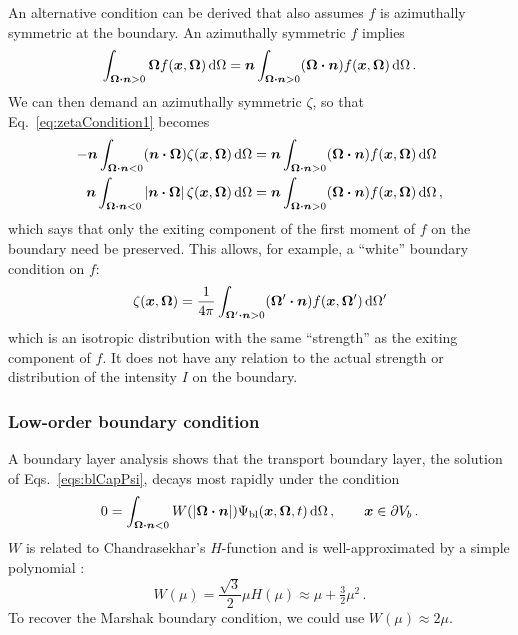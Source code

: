 An alternative condition can be derived that also assumes $f$ is azimuthally
symmetric at the boundary. An azimuthally symmetric $f$ implies
\begin{equation*}
  \int_{\bm{\Omega} \bm{\cdot} \bm{n} > 0}
  \bm{\Omega} f(\bm{x}, \bm{\Omega})\mathop{}\!\mathrm{d}\Omega
  = \bm{n} 
  \int_{\bm{\Omega} \bm{\cdot} \bm{n} > 0}
  (\bm{\Omega} \bm{\cdot} \bm{n} ) f(\bm{x}, \bm{\Omega}) \mathop{}\!\mathrm{d}\Omega\,.
\end{equation*}
We can then demand an azimuthally symmetric $\zeta$, so that
Eq.~\eqref{eq:zetaCondition1} becomes
\begin{align*}
  -\bm{n} \int_{\bm{\Omega} \bm{\cdot} \bm{n} < 0}
  (\bm{n} \bm{\cdot} \bm{\Omega}) \zeta(\bm{x}, \bm{\Omega})\mathop{}\!\mathrm{d}\Omega
  &= \bm{n} \int_{\bm{\Omega} \bm{\cdot} \bm{n} > 0}
  (\bm{\Omega} \bm{\cdot} \bm{n} ) f(\bm{x}, \bm{\Omega}) \mathop{}\!\mathrm{d}\Omega
\\ 
  \bm{n} \int_{\bm{\Omega} \bm{\cdot} \bm{n} < 0}
  \left| \bm{n} \bm{\cdot} \bm{\Omega} \right| \zeta(\bm{x}, \bm{\Omega}) \mathop{}\!\mathrm{d}\Omega
  &= \bm{n} \int_{\bm{\Omega} \bm{\cdot} \bm{n} > 0}
  (\bm{\Omega} \bm{\cdot} \bm{n} ) f(\bm{x}, \bm{\Omega}) \mathop{}\!\mathrm{d}\Omega\,,
\end{align*}
which says that only the exiting component of the first moment of $f$ on the
boundary need be preserved. This allows, for example, a ``white'' boundary
condition on $f$:
\begin{equation}\label{eq:zetaWhite}
  \zeta(\bm{x}, \bm{\Omega})
  = \frac{1}{4\pi} \int_{\bm{\Omega}' \bm{\cdot} \bm{n} > 0}
  (\bm{\Omega}' \bm{\cdot} \bm{n} ) f(\bm{x}, \bm{\Omega}') \mathop{}\!\mathrm{d}\Omega'
\end{equation}
which is an isotropic distribution with the same ``strength'' as the exiting
component of $f$. It does not have any relation to the actual strength or
distribution of the intensity $I$ on the boundary.


\subsubsection{Low-order boundary condition}
A boundary layer analysis \cite{Mal1991}
shows that the transport boundary layer, the solution of
Eqs.~\eqref{eqs:blCapPsi}, decays most rapidly under the condition
\begin{equation} \label{eq:bcW}
  0 = \int_{\bm{\Omega} \bm{\cdot} \bm{n} < 0} W(\left| \bm{\Omega} \bm{\cdot} \bm{n} \right|)
  \Psi_\mathrm{bl} (\bm{x}, \bm{\Omega}, t) \mathop{}\!\mathrm{d} \Omega\,,\qquad \bm{x} \in
  \partial V_b\,.
\end{equation}
$W$ is related to Chandrasekhar's $H$-function \cite{Cha1960} and is
well-approximated by a simple polynomial \cite{Mal1991}:
\begin{equation} \label{eq:chandraW}
  W(\mu) = \frac{\sqrt{3}}{2} \mu H(\mu)
  \approx \mu + \tfrac{3}{2} \mu^2 \,.
\end{equation}
To recover the Marshak boundary condition, we could use $W(\mu) \approx 2 \mu$.

